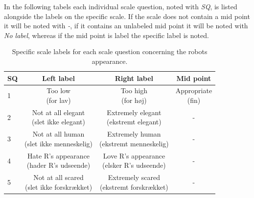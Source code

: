 In the following tabels each individual scale question, noted with \textit{SQ}, is listed alongside the labels on the specific scale. If the scale does not contain a mid point it will be noted with \textit{-}, if it contains an unlabeled mid point it will be noted with \textit{No label}, whereas if the mid point is label the specific label is noted. 
%
\begin{table}[H]
	\centering
	\begin{tabular}{l|c|c|c}
		SQ     & Left label & Right label & Mid point \\\hline
		1   & \makecell{Too low \\(for lav)} & \makecell{Too high \\(for høj)} & \makecell{Appropriate \\(fin)}         \\\hline
		2   & \makecell{Not at all elegant \\(slet ikke elegant)} & \makecell{Extremely elegant \\(ekstremt elegant)} & -         \\\hline
		3   & \makecell{Not at all human \\(slet ikke menneskelig)} & \makecell{Extremely human \\(ekstremt menneskelig)} & -         \\\hline
	 	4   & \makecell{Hate R's appearance \\(hader R's udseende)} & \makecell{Love R's appearance \\(elsker R's udseende)} & -         \\\hline
		5   & \makecell{Not at all scared \\(slet ikke forskrækket)} & \makecell{Extremely scared \\(ekstremt forskrækket)} & -           
	\end{tabular}
	\caption{Specific scale labels for each scale question concerning the robots appearance.}
	\label{tab:AppearanceScale}         
\end{table}
\noindent
%
%
